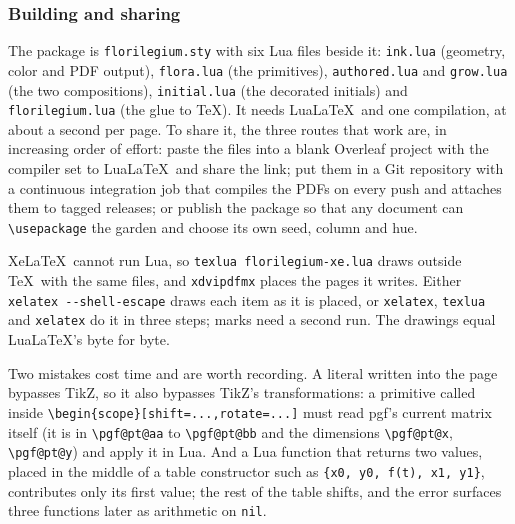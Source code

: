 \subsubsection{Building and sharing}

The package is \texttt{florilegium.sty} with six Lua files beside it: \texttt{ink.lua}
(geometry, color and PDF output), \texttt{flora.lua} (the primitives),
\texttt{authored.lua} and \texttt{grow.lua} (the two compositions), \texttt{initial.lua}
(the decorated initials) and \texttt{florilegium.lua} (the glue to \TeX). It needs Lua\LaTeX\ and one compilation, at
about a second per page. To share it, the three routes that work are, in increasing order
of effort: paste the files into a blank Overleaf project with the compiler set to
Lua\LaTeX\ and share the link; put them in a Git repository with a continuous integration
job that compiles the PDFs on every push and attaches them to tagged releases; or publish
the package so that any document can \texttt{\textbackslash usepackage} the garden and
choose its own seed, column and hue.

Xe\LaTeX\ cannot run Lua, so \texttt{texlua florilegium-xe.lua} draws outside \TeX\ with the
same files, and \texttt{xdvipdfmx} places the pages it writes. Either \verb|xelatex --shell-escape|
draws each item as it is placed, or \texttt{xelatex}, \texttt{texlua} and \texttt{xelatex} do it in
three steps; marks need a second run. The drawings equal Lua\LaTeX's byte for byte.

\begin{remark}
Two mistakes cost time and are worth recording. A literal written into the page bypasses
TikZ, so it also bypasses TikZ's transformations: a primitive called inside
\verb|\begin{scope}[shift=...,rotate=...]| must read pgf's current matrix itself (it is in
\verb|\pgf@pt@aa| to \verb|\pgf@pt@bb| and the dimensions \verb|\pgf@pt@x|,
\verb|\pgf@pt@y|) and apply it in Lua. And a Lua function that returns two values, placed
in the middle of a table constructor such as \verb|{x0, y0, f(t), x1, y1}|, contributes only
its first value; the rest of the table shifts, and the error surfaces three functions
later as arithmetic on \texttt{nil}.
\end{remark}

